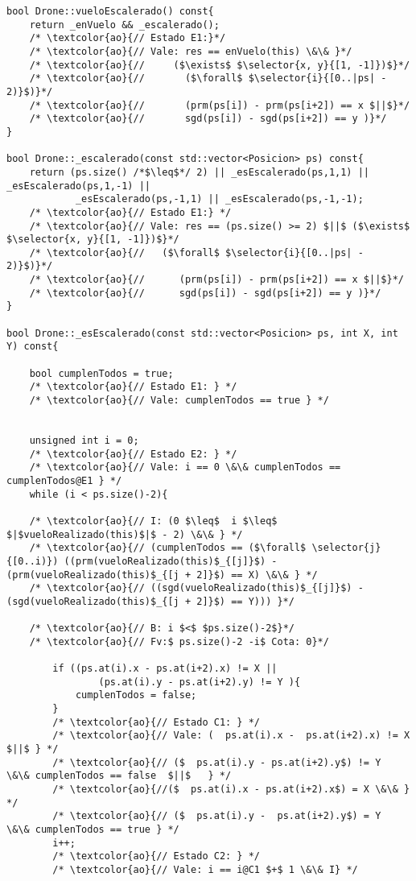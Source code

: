 \begin{lstlisting}
bool Drone::vueloEscalerado() const{
    return _enVuelo && _escalerado();
    /* \textcolor{ao}{// Estado E1:}*/
    /* \textcolor{ao}{// Vale: res == enVuelo(this) \&\& }*/
    /* \textcolor{ao}{//     ($\exists$ $\selector{x, y}{[1, -1]})$}*/
    /* \textcolor{ao}{//       ($\forall$ $\selector{i}{[0..|ps| - 2)}$)}*/
    /* \textcolor{ao}{//       (prm(ps[i]) - prm(ps[i+2]) == x $||$}*/
    /* \textcolor{ao}{//       sgd(ps[i]) - sgd(ps[i+2]) == y )}*/
}

bool Drone::_escalerado(const std::vector<Posicion> ps) const{
    return (ps.size() /*$\leq$*/ 2) || _esEscalerado(ps,1,1) || _esEscalerado(ps,1,-1) ||
            _esEscalerado(ps,-1,1) || _esEscalerado(ps,-1,-1);
    /* \textcolor{ao}{// Estado E1:} */
    /* \textcolor{ao}{// Vale: res == (ps.size() >= 2) $||$ ($\exists$ $\selector{x, y}{[1, -1]})$}*/
    /* \textcolor{ao}{//   ($\forall$ $\selector{i}{[0..|ps| - 2)}$)}*/
    /* \textcolor{ao}{//      (prm(ps[i]) - prm(ps[i+2]) == x $||$}*/
    /* \textcolor{ao}{//      sgd(ps[i]) - sgd(ps[i+2]) == y )}*/
}

bool Drone::_esEscalerado(const std::vector<Posicion> ps, int X, int Y) const{

    bool cumplenTodos = true;
    /* \textcolor{ao}{// Estado E1: } */
    /* \textcolor{ao}{// Vale: cumplenTodos == true } */


    unsigned int i = 0;
    /* \textcolor{ao}{// Estado E2: } */
    /* \textcolor{ao}{// Vale: i == 0 \&\& cumplenTodos == cumplenTodos@E1 } */
    while (i < ps.size()-2){
    
    /* \textcolor{ao}{// I: (0 $\leq$  i $\leq$ $|$vueloRealizado(this)$|$ - 2) \&\& } */
    /* \textcolor{ao}{// (cumplenTodos == ($\forall$ \selector{j}{[0..i)}) ((prm(vueloRealizado(this)$_{[j]}$) - (prm(vueloRealizado(this)$_{[j + 2]}$) == X) \&\& } */ 
    /* \textcolor{ao}{// ((sgd(vueloRealizado(this)$_{[j]}$) - (sgd(vueloRealizado(this)$_{[j + 2]}$) == Y))) }*/
     
    /* \textcolor{ao}{// B: i $<$ $ps.size()-2$}*/
    /* \textcolor{ao}{// Fv:$ ps.size()-2 -i$ Cota: 0}*/

        if ((ps.at(i).x - ps.at(i+2).x) != X ||
                (ps.at(i).y - ps.at(i+2).y) != Y ){
            cumplenTodos = false;
        }
        /* \textcolor{ao}{// Estado C1: } */
        /* \textcolor{ao}{// Vale: (  ps.at(i).x -  ps.at(i+2).x) != X $||$ } */ 
        /* \textcolor{ao}{// ($  ps.at(i).y - ps.at(i+2).y$) != Y  \&\& cumplenTodos == false  $||$   } */ 
        /* \textcolor{ao}{//($  ps.at(i).x - ps.at(i+2).x$) = X \&\& } */ 
        /* \textcolor{ao}{// ($  ps.at(i).y -  ps.at(i+2).y$) = Y  \&\& cumplenTodos == true } */
        i++;
        /* \textcolor{ao}{// Estado C2: } */
        /* \textcolor{ao}{// Vale: i == i@C1 $+$ 1 \&\& I} */


\end{lstlisting}
